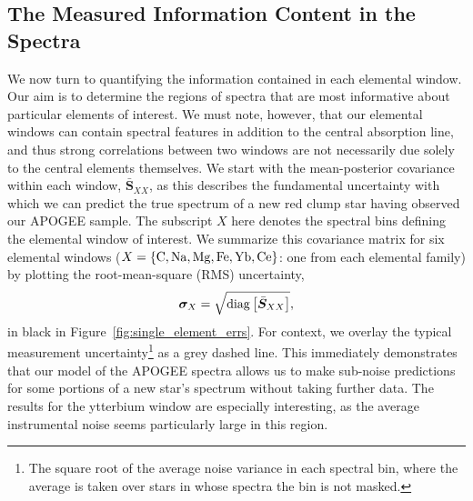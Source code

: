 \documentclass[a4paper,fleqn,usenatbib]{mnras}
\newcommand{\speccov}{{\bm S}}
\begin{document}
\subsection{The Measured Information Content in the Spectra}
\label{sec:info}

We now turn to quantifying the information contained in each elemental window. Our aim is to determine the regions of spectra that are most informative about particular elements of interest. We must note, however, that our elemental windows can contain spectral features in addition to the central absorption line, and thus strong correlations between two windows are not necessarily due solely to the central elements themselves. We start with the mean-posterior covariance within each window, $\bar{\speccov}_{XX}$, as this describes the fundamental uncertainty with which we can predict the true spectrum of a new red clump star having observed our APOGEE sample. The subscript $X$ here denotes the spectral bins defining the elemental window of interest. We summarize this covariance matrix for six elemental windows ($X=\{{\rm C, Na, Mg, Fe, Yb, Ce}\}$: one from each elemental family) by plotting the root-mean-square (RMS) uncertainty,
\begin{equation}
\bm{\sigma}_X = \sqrt{{\rm diag} \left[\bar{\speccov}_{XX}\right]},
\end{equation}
in black in Figure~\ref{fig:single_element_errs}. For context, we overlay the typical measurement uncertainty\footnote{The square root of the average noise variance in each spectral bin, where the average is taken over stars in whose spectra the bin is not masked.} as a grey dashed line. This immediately demonstrates that our model of the APOGEE spectra allows us to make sub-noise predictions for some portions of a new star's spectrum without taking further data. The results for the ytterbium window are especially interesting, as the average instrumental noise seems particularly large in this region.
\end{document}
